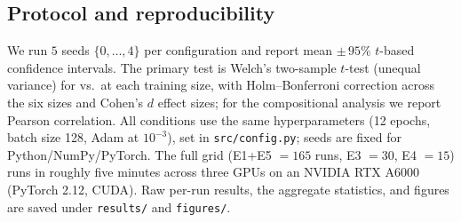 \subsection{Protocol and reproducibility}
We run $5$ seeds $\{0,\dots,4\}$ per configuration and report mean ${\pm}\,95\%$ $t$-based confidence
intervals. The primary test is Welch's two-sample $t$-test (unequal variance) for \nesy vs.\ \neural at
each training size, with Holm--Bonferroni correction across the six sizes and Cohen's $d$ effect sizes;
for the compositional analysis we report Pearson correlation. All conditions use the same
hyperparameters (12 epochs, batch size 128, Adam at $10^{-3}$), set in \texttt{src/config.py}; seeds are
fixed for Python/NumPy/PyTorch. The full grid (E1+E5 $=165$ runs, E3 $=30$, E4 $=15$) runs in roughly
five minutes across three GPUs on an NVIDIA RTX A6000 (PyTorch 2.12, CUDA). Raw per-run results, the
aggregate statistics, and figures are saved under \texttt{results/} and \texttt{figures/}.

